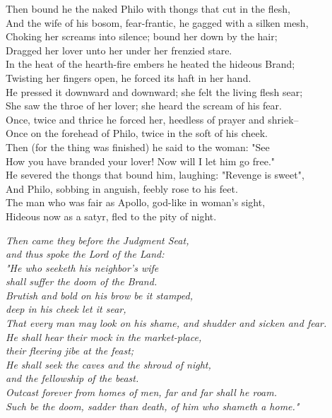 \begin{poemblock}
Then bound he the naked Philo with thongs that cut in the flesh,\\
And the wife of his bosom, fear-frantic, he gagged with a silken mesh,\\
Choking her screams into silence; bound her down by the hair;\\
Dragged her lover unto her under her frenzied stare.\\
In the heat of the hearth-fire embers he heated the hideous Brand;\\
Twisting her fingers open, he forced its haft in her hand.\\
He pressed it downward and downward; she felt the living flesh sear;\\
She saw the throe of her lover; she heard the scream of his fear.\\
Once, twice and thrice he forced her, heedless of prayer and shriek--\\
Once on the forehead of Philo, twice in the soft of his cheek.\\
Then (for the thing was finished) he said to the woman:  "See\\
How you have branded your lover!  Now will I let him go free."\\
He severed the thongs that bound him, laughing:  "Revenge is sweet",\\
And Philo, sobbing in anguish, feebly rose to his feet.\\
The man who was fair as Apollo, god-like in woman's sight,\\
Hideous now as a satyr, fled to the pity of night.

\textit{
\idt Then came they before the Judgment Seat,\\
and thus spoke the Lord of the Land:\\
\idt "He who seeketh his neighbor's wife\\
shall suffer the doom of the Brand.\\
\idt Brutish and bold on his brow be it stamped,\\
deep in his cheek let it sear,\\
\idt That every man may look on his shame, and shudder and sicken and fear.\\
\idt He shall hear their mock in the market-place,\\
their fleering jibe at the feast;\\
\idt He shall seek the caves and the shroud of night,\\
and the fellowship of the beast.\\
\idt Outcast forever from homes of men, far and far shall he roam.\\
\idt Such be the doom, sadder than death, of him who shameth a home."
}
\end{poemblock}
